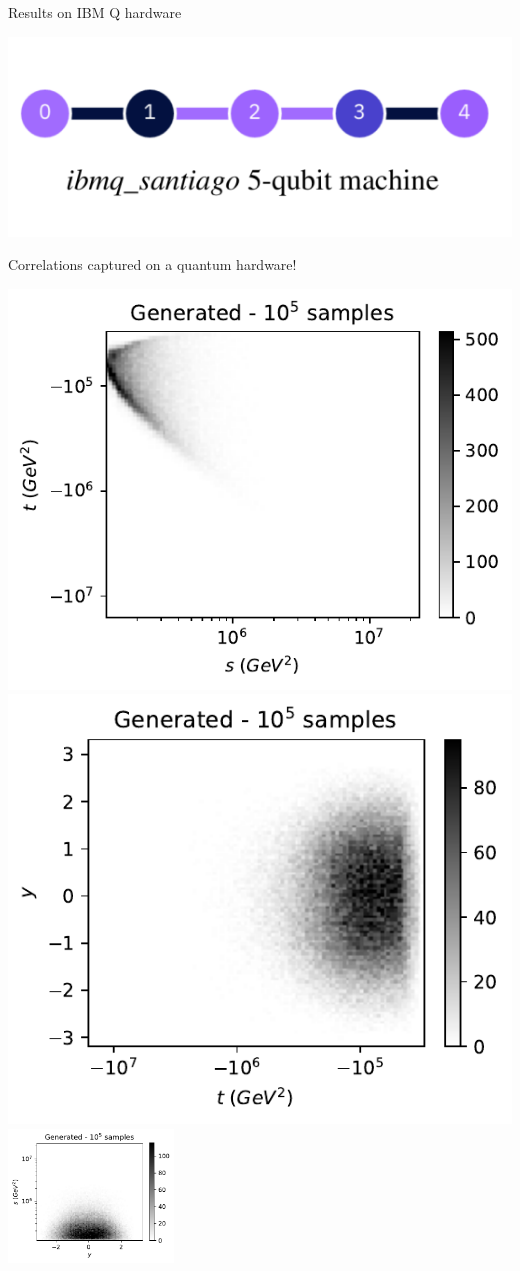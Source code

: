 \documentclass[11pt,aspectratio=169]{beamer}
\begin{document}
\begin{frame}{Results on IBM Q hardware}
    \begin{multicols*}{2}
        \includegraphics[width=0.37 \textwidth]{figures/ibm5q.png}
        \begin{tcolorbox}
           Correlations captured on a quantum hardware!
        \end{tcolorbox}
    \end{multicols*}
    \begin{multicols*}{3}
        \includegraphics[width=0.33 \textwidth]{figures/plots/hardware/ibm_santiago/s-t_FAKE_IBM_100k.pdf}
        \includegraphics[width=0.33 \textwidth]{figures/plots/hardware/ibm_santiago/t-y_FAKE_IBM_100k.pdf}
        \includegraphics[width=0.33\textwidth]{figures/plots/hardware/ibm_santiago/y-s_FAKE_IBM_100k.pdf}
    \end{multicols*}
\end{frame}
\end{document}
